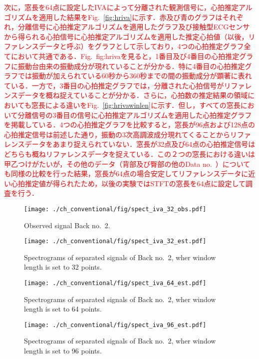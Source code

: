 \textcolor{red}{次に，窓長を64点に設定したIVAによって分離された観測信号に，心拍推定アルゴリズムを適用した結果をFig.~\ref{fig:hriva}に示す．赤及び青のグラフはそれぞれ，分離信号に心拍推定アルゴリズムを適用したグラフ及び接触型ECGセンサから得られる心拍信号に心拍推定アルゴリズムを適用した推定心拍値（以後，リファレンスデータと呼ぶ）をグラフとして示しており，4つの心拍推定グラフ全てにおいて共通である．Fig.~{fig:hriva}を見ると，1番目及び4番目の心拍推定グラフに振動台由来の振動成分が現れていることが分かる．特に4番目の心拍推定グラフでは振動が加えられている60秒から360秒までの間の振動成分が顕著に表れている．一方で，3番目の心拍推定グラフでは，分離された心拍信号がリファレンスデータを概ね捉えていることが分かる．さらに，心拍数の推定結果の領域においても窓長による違いをFig.~\ref{fig:hrivawinlen}に示す．但し，すべての窓長において分離信号の3番目の信号に心拍推定アルゴリズムを適用した心拍推定グラフを掲載している．4つの心拍推定グラフを比較すると，窓長が96点および128点の心拍推定信号は前述した通り，振動の3次高調波成分現れてくることからリファレンスデータをあまり捉えられていない．窓長が32点及び64点の心拍推定信号はどちらも概ねリファレンスデータを捉えている．この２つの窓長における違いは甲乙つけがたいが，その他のデータ（背部及び臀部の他のData no.~）についても同様の比較を行った結果，窓長が64点の場合安定してリファレンスデータに近い心拍推定値が得られたため，以後の実験ではSTFTの窓長を64点に設定して調査を行う．}


\begin{figure}[tb]
\centering
\texttt{[image: ./ch\_conventional/fig/spect\_iva\_32\_obs.pdf]}
\caption{Observed signal Back no.~2.}
\label{fig:siva32obs}
\end{figure}

\begin{figure}[tb]
\centering
\texttt{[image: ./ch\_conventional/fig/spect\_iva\_32\_est.pdf]}
\caption{Spectrograms of separated signals of Back no.~2, wher window length is set to 32 points.}
\label{fig:siva32est}
\end{figure}

\begin{figure}[tb]
\centering
\texttt{[image: ./ch\_conventional/fig/spect\_iva\_64\_est.pdf]}
\caption{Spectrograms of separated signals of Back no.~2, wher window length is set to 64 points.}
\label{fig:siva64est}
\end{figure}

\begin{figure}[tb]
\centering
\texttt{[image: ./ch\_conventional/fig/spect\_iva\_96\_est.pdf]}
\caption{Spectrograms of separated signals of Back no.~2, wher window length is set to 96 points.}
\label{fig:siva96est}
\end{figure}

